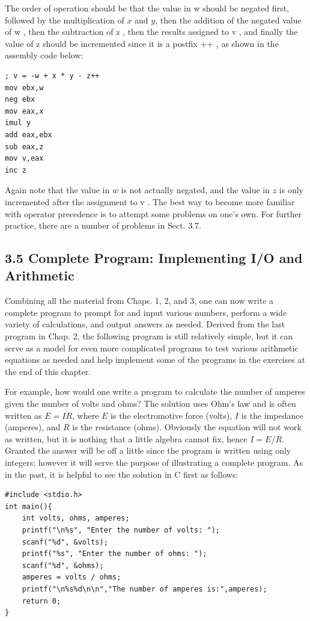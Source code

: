 \documentclass[10pt]{book}
\begin{document}
The order of operation should be that the value in w should be negated first, followed by the multiplication of $x$ and $y$, then the addition of the negated value of w , then the subtraction of z , then the results assigned to v , and finally the value of z should be incremented since it is a postfix ++ , as shown in the assembly code below:

\begin{verbatim}
; v = -w + x * y - z++
mov ebx,w
neg ebx
mov eax,x
imul y
add eax,ebx
sub eax,z
mov v,eax
inc z
\end{verbatim}

Again note that the value in $w$ is not actually negated, and the value in $z$ is only incremented after the assignment to v . The best way to become more familiar with operator precedence is to attempt some problems on one's own. For further practice, there are a number of problems in Sect. 3.7.

\subsection*{3.5 Complete Program: Implementing I/O and Arithmetic}
Combining all the material from Chaps. 1, 2, and 3, one can now write a complete program to prompt for and input various numbers, perform a wide variety of calculations, and output answers as needed. Derived from the last program in Chap. 2, the following program is still relatively simple, but it can serve as a model for even more complicated programs to test various arithmetic equations as needed and help implement some of the programs in the exercises at the end of this chapter.

For example, how would one write a program to calculate the number of amperes given the number of volts and ohms? The solution uses Ohm's law and is often written as $E=I R$, where $E$ is the electromotive force (volts), $I$ is the impedance (amperes), and $R$ is the resistance (ohms). Obviously the equation will not work as written, but it is nothing that a little algebra cannot fix, hence $I=E / R$. Granted the answer will be off a little since the program is written using only integers; however it will serve the purpose of illustrating a complete program. As in the past, it is helpful to see the solution in C first as follows:

\begin{verbatim}
#include <stdio.h>
int main(){
    int volts, ohms, amperes;
    printf("\n%s", "Enter the number of volts: ");
    scanf("%d", &volts);
    printf("%s", "Enter the number of ohms: ");
    scanf("%d", &ohms);
    amperes = volts / ohms;
    printf("\n%s%d\n\n","The number of amperes is:",amperes);
    return 0;
}
\end{verbatim}
\end{document}
